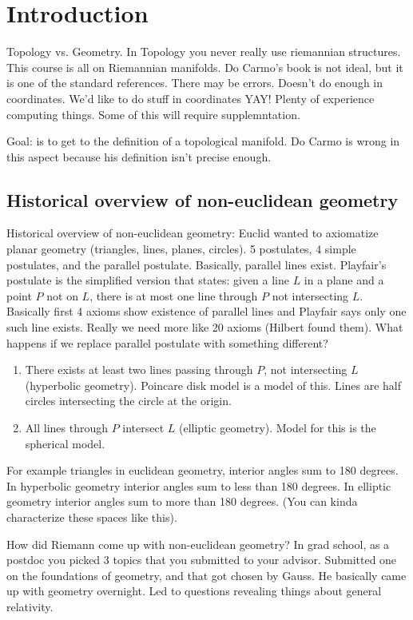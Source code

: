 \documentclass[a4paper]{article}
\begin{document}
\section*{Introduction}
Topology vs. Geometry. In Topology you never really use riemannian structures. This course is all on Riemannian manifolds. Do Carmo's book is not ideal, but it is one of the standard references. There may be errors. Doesn't do enough in coordinates. We'd like to do stuff in coordinates YAY! Plenty of experience computing things. Some of this will require supplemntation.

Goal: is to get to the definition of a topological manifold. Do Carmo is wrong in this aspect because his definition isn't precise enough.

\subsection*{Historical overview of non-euclidean geometry}
Historical overview of non-euclidean geometry: Euclid wanted to axiomatize planar geometry (triangles, lines, planes, circles). 5 postulates, 4 simple postulates, and the parallel postulate. Basically, parallel lines exist. Playfair's postulate is the simplified version that states: given a line $L$ in a plane and a point $P$ not on $L$, there is at most one line through $P$ not intersecting $L$. Basically first 4 axioms show existence of parallel lines and Playfair says only one such line exists. Really we need more like 20 axioms (Hilbert found them). What happens if we replace parallel postulate with something different? 

\begin{enumerate}
    \item There exists at least two lines passing through $P$, not intersecting $L$ (hyperbolic geometry). Poincare disk model is a model of this. Lines are half circles intersecting the circle at the origin.
    \item All lines through $P$ intersect $L$ (elliptic geometry). Model for this is the spherical model.
\end{enumerate}

For example triangles in euclidean geometry, interior angles sum to 180 degrees. In hyperbolic geometry interior angles sum to less than 180 degrees. In elliptic geometry interior angles sum to more than 180 degrees. (You can kinda characterize these spaces like this).

How did Riemann come up with non-euclidean geometry? In grad school, as a postdoc you picked 3 topics that you submitted to your advisor. Submitted one on the foundations of geometry, and that got chosen by Gauss. He basically came up with geometry overnight. Led to questions revealing things about general relativity.
\end{document}
